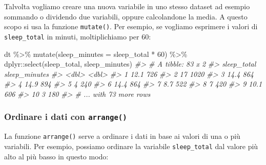 \documentclass[
]{memoir}
\newenvironment{Shaded}{\begin{snugshade}}{\end{snugshade}}
\newcommand{\AttributeTok}[1]{\textcolor[rgb]{0.77,0.63,0.00}{#1}}
\newcommand{\CommentTok}[1]{\textcolor[rgb]{0.56,0.35,0.01}{\textit{#1}}}
\newcommand{\DecValTok}[1]{\textcolor[rgb]{0.00,0.00,0.81}{#1}}
\newcommand{\FunctionTok}[1]{\textcolor[rgb]{0.00,0.00,0.00}{#1}}
\newcommand{\NormalTok}[1]{#1}
\newcommand{\SpecialCharTok}[1]{\textcolor[rgb]{0.00,0.00,0.00}{#1}}
\theoremstyle{definition}
\theoremstyle{definition}
\theoremstyle{definition}
\theoremstyle{definition}
\theoremstyle{remark}
\begin{document}
Talvolta vogliamo creare una nuova variabile in uno stesso dataset ad
esempio sommando o dividendo due variabili, oppure calcolandone la
media. A questo scopo si usa la funzione \texttt{mutate()}. Per esempio, se
vogliamo esprimere i valori di \texttt{sleep\_total} in minuti, moltiplichiamo
per 60:

\begin{Shaded}
\begin{Highlighting}[]
\NormalTok{dt }\SpecialCharTok{\%\textgreater{}\%}
  \FunctionTok{mutate}\NormalTok{(}\AttributeTok{sleep\_minutes =}\NormalTok{ sleep\_total }\SpecialCharTok{*} \DecValTok{60}\NormalTok{) }\SpecialCharTok{\%\textgreater{}\%}
\NormalTok{  dplyr}\SpecialCharTok{::}\FunctionTok{select}\NormalTok{(sleep\_total, sleep\_minutes)}
\CommentTok{\#\textgreater{} \# A tibble: 83 x 2}
\CommentTok{\#\textgreater{}    sleep\_total sleep\_minutes}
\CommentTok{\#\textgreater{}          \textless{}dbl\textgreater{}         \textless{}dbl\textgreater{}}
\CommentTok{\#\textgreater{}  1        12.1           726}
\CommentTok{\#\textgreater{}  2        17            1020}
\CommentTok{\#\textgreater{}  3        14.4           864}
\CommentTok{\#\textgreater{}  4        14.9           894}
\CommentTok{\#\textgreater{}  5         4             240}
\CommentTok{\#\textgreater{}  6        14.4           864}
\CommentTok{\#\textgreater{}  7         8.7           522}
\CommentTok{\#\textgreater{}  8         7             420}
\CommentTok{\#\textgreater{}  9        10.1           606}
\CommentTok{\#\textgreater{} 10         3             180}
\CommentTok{\#\textgreater{} \# ... with 73 more rows}
\end{Highlighting}
\end{Shaded}

\hypertarget{ordinare-i-dati-con-arrange}{%
\subsubsection{\texorpdfstring{Ordinare i dati con \texttt{arrange()}}{Ordinare i dati con arrange()}}\label{ordinare-i-dati-con-arrange}}

La funzione \texttt{arrange()} serve a ordinare i dati in base ai valori di una
o più variabili. Per esempio, possiamo ordinare la variabile
\texttt{sleep\_total} dal valore più alto al più basso in questo modo:
\end{document}
